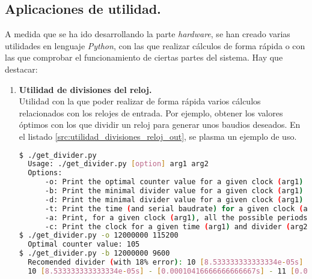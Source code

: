 \subsection{Aplicaciones de utilidad.}
A medida que se ha ido desarrollando la parte \emph{hardware}, se han creado varias utilidades en lenguaje \emph{Python}, con las que realizar cálculos de forma rápida o con las que comprobar el funcionamiento de ciertas partes del sistema. Hay que destacar:
\begin{enumerate}
    \item \textbf{Utilidad de divisiones del reloj.} \\
    Utilidad con la que poder realizar de forma rápida varios cálculos relacionados con los relojes de entrada. Por ejemplo, obtener los valores óptimos con los que dividir un reloj para generar unos baudios deseados. En el listado \ref{src:utilidad_divisiones_reloj_out}, se plasma un ejemplo de uso.
    \begin{lstlisting}[language=bash,
        caption={Ejemplo de la utilidad de divisiones de reloj.},
        label=src:utilidad_divisiones_reloj_out]
$ ./get_divider.py
  Usage: ./get_divider.py [option] arg1 arg2
  Options: 
      -o: Print the optimal counter value for a given clock (arg1) and Serial baudrate (arg2). [Default]
      -b: Print the minimal divider value for a given clock (arg1) and Serial baudrate (arg2).
      -d: Print the minimal divider value for a given clock (arg1) and time (arg2).
      -t: Print the time (and serial baudrate) for a given clock (arg1) and divider (arg2).
      -a: Print, for a given clock (arg1), all the possible periods that can be generated between 0 and arg2.
      -c: Print the clock for a given time (arg1) and divider (arg2).
$ ./get_divider.py -o 12000000 115200
  Optimal counter value: 105
$ ./get_divider.py -b 12000000 9600
  Recomended divider (with 18% error): 10 [8.533333333333334e-05s]
  10 [8.533333333333334e-05s] - [0.00010416666666666667s] - 11 [0.00017066666666666668s]          
    \end{lstlisting}
    

\end{enumerate}
